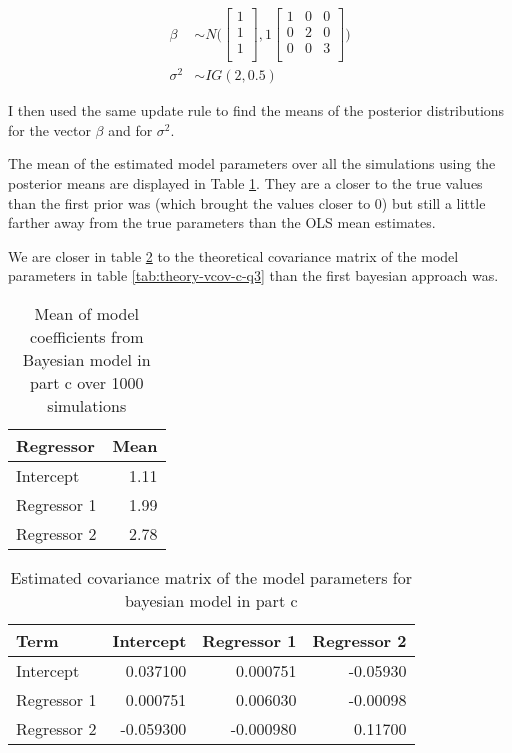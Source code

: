 \documentclass[]{book}
\begin{document}
\begin{align}
  \beta &\sim N \bigg( 
  \begin{bmatrix}
  1\\
  1\\
  1\\
  \end{bmatrix},
  1 \begin{bmatrix}
  1 & 0 & 0\\
  0 & 2 & 0\\
  0 & 0 & 3\\
  \end{bmatrix} \bigg)\\
  \sigma^2 &\sim IG(2, 0.5)
\end{align}

I then used the same update rule to find the means of the posterior distributions for the vector \(\beta\) and for \(\sigma^2\).

The mean of the estimated model parameters over all the simulations using the posterior means are displayed in Table \ref{tab:bayes-c-mean-coefs-q3}. They are a closer to the true values than the first prior was (which brought the values closer to 0) but still a little farther away from the true parameters than the OLS mean estimates.

We are closer in table \ref{tab:bayes-c-est-vcov-q3} to the theoretical covariance matrix of the model parameters in table \ref{tab:theory-vcov-c-q3} than the first bayesian approach was.

\begin{table}

\caption{\label{tab:bayes-c-mean-coefs-q3}Mean of model coefficients from Bayesian model in part c over 1000 simulations}
\centering
\begin{tabular}[t]{lr}
\toprule
Regressor & Mean\\
\midrule
Intercept & 1.11\\
Regressor 1 & 1.99\\
Regressor 2 & 2.78\\
\bottomrule
\end{tabular}
\end{table}

\begin{table}

\caption{\label{tab:bayes-c-est-vcov-q3}Estimated covariance matrix of the model parameters for bayesian model in part c}
\centering
\begin{tabular}[t]{lrrr}
\toprule
Term & Intercept & Regressor 1 & Regressor 2\\
\midrule
Intercept & 0.037100 & 0.000751 & -0.05930\\
Regressor 1 & 0.000751 & 0.006030 & -0.00098\\
Regressor 2 & -0.059300 & -0.000980 & 0.11700\\
\bottomrule
\end{tabular}
\end{table}
\end{document}
